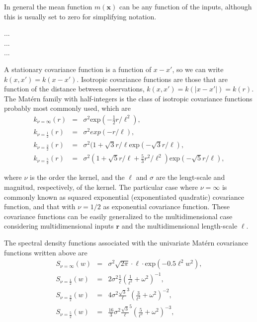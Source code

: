 \documentclass[]{interact}
\theoremstyle{plain}%
\theoremstyle{definition}
\theoremstyle{remark}
\begin{document}
 In general the mean function $m(\mathbf{x})$ can be any function of the inputs, although this is usually set to zero for simplifying notation. 

\vspace{0.5cm}
\noindent ... \\
... \\
...


\vspace{0.5cm}
A stationary covariance function is a function of $x-x'$, so we can write $k(x,x') = k(x-x')$. Isotropic covariance functions are those that are function of the distance between observations, $k(x,x') = k(|x-x'|) = k(r)$. The Mat\'ern family with half-integers is the class of isotropic covariance functions probably most commonly used, which are
%
\begin{eqnarray}
k_{\nu=\infty}(r)&=&\sigma^2 \text{exp}(-\frac{1}{2} r/\ell^2), \nonumber \\
k_{\nu=\frac{1}{2}}(r)&=&\sigma^2 exp(-r/\ell), \nonumber \\
k_{\nu=\frac{3}{2}}(r)&=&\sigma^2(1+\sqrt{3}r/\ell \text{exp}(-\sqrt{3}r/\ell), \nonumber \\
k_{\nu=\frac{5}{2}}(r)&=&\sigma^2(1+\sqrt{5}r/\ell+\frac{5}{3}r^2/\ell^2) \text{exp}(-\sqrt{5}r/\ell), \nonumber 
\end{eqnarray}

\noindent where $\nu$ is the order the kernel, and the $\ell$ and $\sigma$ are the lengt-scale and magnitud, respectively, of the kernel. The particular case where $\nu=\infty$ is commonly known as squared exponential (exponentiated quadratic) covariance function, and that with $\nu=1/2$ as exponential covariance function. These covariance functions can be easily generalized to the multidimensional case considering multidimensional inputs $\mathbf{r}$ and the multidimensional length-scale $\boldsymbol{\ell}$. 

The spectral density functions associated with the univariate Mat\'ern covariance functions written above are
%
\begin{eqnarray}
S_{\nu=\infty}(w)&=& \sigma^2 \sqrt{2\pi} \cdot \ell \cdot \text{exp}(-0.5 \ell^2 w^2), \nonumber \\
S_{\nu=\frac{1}{2}}(w)&=& 2\sigma^2 \frac{1}{\ell}(\frac{1}{\ell^2} + \omega^2)^{-1}, \nonumber \\
S_{\nu=\frac{3}{2}}(w)&=& 4\sigma^2 \frac{\sqrt{3}}{\ell}^{3}(\frac{3}{\ell^2} + \omega^2)^{-2}, \nonumber \\
S_{\nu=\frac{5}{2}}(w)&=& \frac{16}{3}\sigma^2 \frac{\sqrt{3}}{\ell}^{5}(\frac{5}{\ell^2} + \omega^2)^{-3}, \nonumber 
\end{eqnarray}
\end{document}
